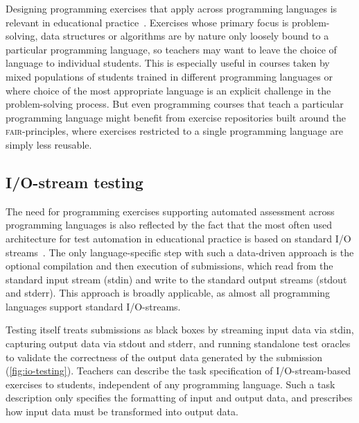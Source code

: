 \documentclass[../main]{subfiles}
\begin{document}
Designing programming exercises that apply across programming languages is relevant in educational practice~\autocite{murphyAnalysisIntroductoryProgramming2017}.
Exercises whose primary focus is problem-solving, data structures or algorithms are by nature only loosely bound to a particular programming language, so teachers may want to leave the choice of language to individual students.
This is especially useful in courses taken by mixed populations of students trained in different programming languages or where choice of the most appropriate language is an explicit challenge in the problem-solving process.
But even programming courses that teach a particular programming language might benefit from exercise repositories built around the \textsc{fair}-principles, where exercises restricted to a single programming language are simply less reusable.

\subsection{I/O-stream testing}\label{subsec:dsl-i/o-stream-testing}

The need for programming exercises supporting automated assessment across programming languages is also reflected by the fact that the most often used architecture for test automation in educational practice is based on standard I/O streams~\autocite{douceAutomaticTestbasedAssessment2005,ullahEffectAutomaticAssessment2018,wasikSurveyOnlineJudge2018}.
The only language-specific step with such a data-driven approach is the optional compilation and then execution of submissions, which read from the standard input stream (stdin) and write to the standard output streams (stdout and stderr).
This approach is broadly applicable, as almost all programming languages support standard I/O-streams.

Testing itself treats submissions as black boxes by streaming input data via stdin, capturing output data via stdout and stderr, and running standalone test oracles to validate the correctness of the output data generated by the submission (\vref{fig:io-testing}).
Teachers can describe the task specification of I/O-stream-based exercises to students, independent of any programming language.
Such a task description only specifies the formatting of input and output data, and prescribes how input data must be transformed into output data.
\end{document}
